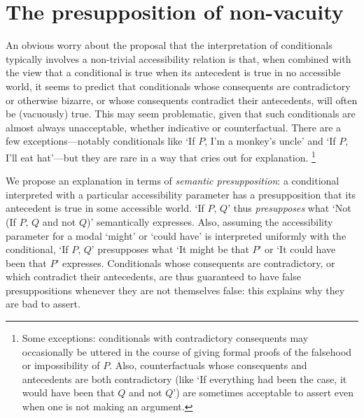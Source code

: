 \documentclass[If.tex]{subfiles}
\begin{document}

\section{The presupposition of non-vacuity}
\label{sect:nonvacuity}
An obvious worry about the proposal that the interpretation of conditionals typically involves a non-trivial accessibility relation is that, when combined with the view that a conditional is true when its antecedent is true in no accessible world, it seems to predict that conditionals whose consequents are contradictory or otherwise bizarre, or whose consequents contradict their antecedents, will often be (vacuously) true.  This may seem problematic, given that such conditionals are almost always unacceptable, whether indicative or counterfactual.  There are a few exceptions---notably conditionals like ‘If $P$, I'm a monkey's uncle’ and ‘If $P$, I'll eat hat’---but they are rare in a way that cries out for explanation.%
\footnote{Some exceptions: conditionals with contradictory consequents may occasionally be uttered in the course of giving formal proofs of the falsehood or impossibility of $P$.  Also, counterfactuals whose consequents and antecedents are both contradictory (like ‘If everything had been the case, it would have been that $Q$ and not $Q$’) are sometimes acceptable to assert even when one is not making an argument.}

We propose an explanation in terms of \emph{semantic presupposition}: a conditional interpreted with a particular accessibility parameter has a presupposition that its antecedent is true in some accessible world.  ‘If $P$, $Q$’ thus \emph{presupposes} what ‘Not (If $P$, $Q$ and not $Q$)’ semantically expresses.  Also, assuming the accessibility parameter for a modal ‘might’ or ‘could have’ is interpreted uniformly with the conditional, ‘If $P$, $Q$’ presupposes what ‘It might be that $P$’ or ‘It could have been that $P$’ expresses.  Conditionals whose consequents are contradictory, or which contradict their antecedents, are thus guaranteed to have false presuppositions whenever they are not themselves false: this explains why they are bad to assert.
\end{document}
